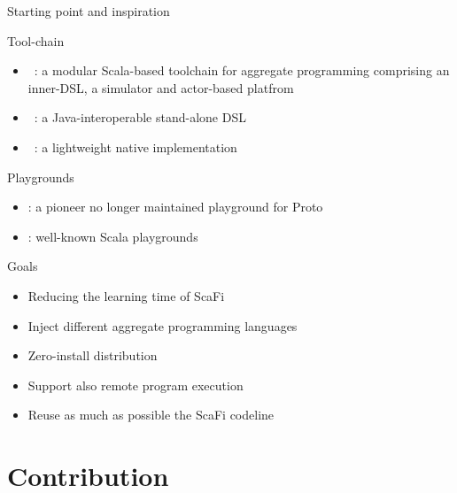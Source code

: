 \documentclass[presentation]{beamer}
\let\oldcite\cite
\newcommand{\scafi}{{\sc{}ScaFi}}
\renewcommand{\cite}[1]{{\color{blue}\oldcite{#1}}}
\begin{document}
\begin{frame}[fragile]{Starting point and inspiration}

\begin{block}{Tool-chain}
  \begin{itemize}
  \item {}~\cite{DBLP:conf/ecoop/CasadeiV16}: a modular Scala-based toolchain for aggregate programming comprising an inner-DSL, a simulator and actor-based platfrom
  \item {}~\cite{ProtelisSAC14}: a Java-interoperable stand-alone DSL
  \item {}~\cite{fcpp}: a lightweight native implementation
  \end{itemize}
\end{block}
  
\begin{block}{Playgrounds}

\begin{itemize}
\item \lenf{WebProto~\cite{DBLP:conf/saso/UsbeckB13}}: a pioneer no longer maintained playground for Proto
\item {}: well-known Scala playgrounds
\end{itemize}

\end{block}
\end{frame}

\begin{frame}[fragile]{Goals}

\begin{itemize}
\item Reducing the learning time of \scafi{}
\item Inject different aggregate programming languages
\item Zero-install distribution
\item Support also remote program execution
\item Reuse as much as possible the \scafi{} codeline
\end{itemize}
  
\end{frame}

\section{Contribution}
\end{document}

